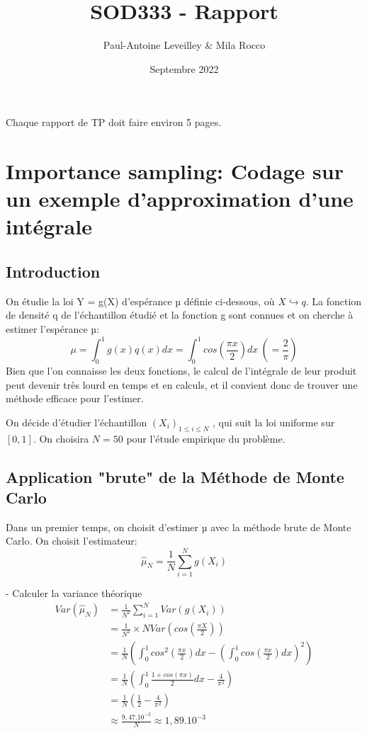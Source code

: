 \documentclass{article}
\title{SOD333 - Rapport}
\author{Paul-Antoine Leveilley \& Mila Rocco}
\date{Septembre 2022}
\begin{document}
\maketitle

\begin{center}
Chaque rapport de TP doit faire environ 5 pages.
\end{center}







\newpage
\section{Importance sampling: Codage sur un exemple d'approximation d'une intégrale}

\subsection{Introduction}
On étudie la loi Y = g(X) d'espérance µ définie ci-dessous, où $X \hookrightarrow q$. La fonction de densité q de l'échantillon étudié et la fonction g sont connues et on cherche à estimer l'espérance µ:
$$\mu = \int_0^1 g(x)q(x)dx = \int_0^1 cos(\frac{\pi x}{2})dx\ (=\frac{2}{\pi})$$
Bien que l'on connaisse les deux fonctions, le calcul de l'intégrale de leur produit peut devenir très lourd en temps et en calculs, et il convient donc de trouver une méthode efficace pour l'estimer.

On décide d'étudier l'échantillon $(X_i)_{1\leq i \leq N}$ , qui suit la loi uniforme sur $[0,1]$. On choisira $N=50$ pour l'étude empirique du problème.

 \subsection{Application "brute" de la Méthode de Monte Carlo}
Dans un premier temps, on choisit d'estimer µ avec la méthode brute de Monte Carlo. On choisit l'estimateur: $$\hat{\mu}_N = \frac{1}{N} \sum_{i=1}^N g(X_i)$$

- Calculer la variance théorique\\
\begin{align*} 
  Var(\hat{\mu}_N) &= \frac1{N^2} \sum_{i=1}^N Var(g(X_i))\\ 
  &= \frac1{N^2}\times N Var(cos(\frac{\pi X}2)) \\ 
  &= \frac1{N} \left ( \int_0^1 cos^2(\frac{\pi x}2)dx - \left ( \int_0^1 cos(\frac{\pi x}2)dx \right )^2 \right )\\
  &= \frac1{N} \left ( \int_0^1 \frac{1+cos(\pi x)}{2}dx - 
   \frac4{\pi^2} \right )\\
  &= \frac1{N} \left ( \frac{1}{2} - 
   \frac4{\pi^2} \right )\\
  &\approx \frac{9,47.10^{-2}}{N} \approx 1,89.10^{-3}
\end{align*}
\end{document}
